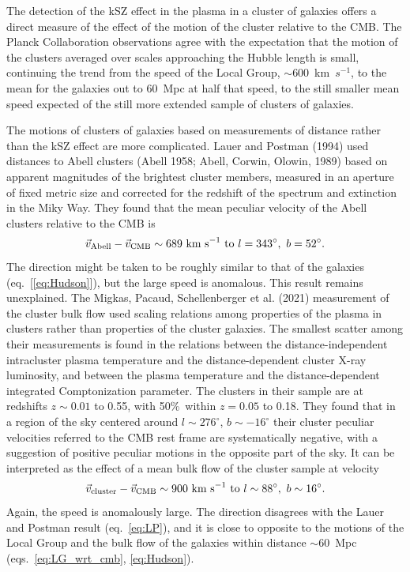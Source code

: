 \documentclass[fleqn,usenatbib]{mnras}
\newcommand{\beq}{\begin{equation}}
\newcommand{\eeq}{\end{equation}}
\begin{document}
The detection of the kSZ effect in the plasma in a cluster of galaxies offers a direct measure of the effect of the motion of the cluster relative to the CMB. The Planck Collaboration observations agree with the expectation that the motion of the clusters averaged over scales approaching the Hubble length is small, continuing the trend from the speed of the Local Group, $\sim 600$~km~$s^{-1}$, to the mean for the galaxies out to 60~Mpc at half that speed, to the still smaller mean speed expected of the still more extended sample of clusters of galaxies. 

The motions of clusters of galaxies based on measurements of distance rather than the kSZ effect are more complicated. Lauer and Postman (1994) used distances to Abell clusters  (Abell 1958; Abell, Corwin, Olowin, 1989) based on apparent magnitudes of the brightest cluster members, measured in an aperture of fixed metric size and corrected for the redshift of the spectrum and extinction in the Miky Way. They found that the mean peculiar velocity of the Abell clusters relative to the CMB is
\beq
{\vec v}_{\rm Abell} - {\vec v}_{\rm CMB} \sim 689\hbox{ km s}^{-1}\hbox{ to } l = 343^\circ ,\ b = 52^\circ.\label{eq:LP}
\eeq
The direction might be taken to be roughly similar to that of the galaxies (eq.~[\ref{eq:Hudson}]), but the large speed is anomalous. This result remains unexplained. The Migkas, Pacaud, Schellenberger et al. (2021) measurement of the cluster bulk flow used scaling relations among properties of the plasma in clusters rather than properties of the cluster galaxies. The smallest scatter among their measurements is found in the relations between the distance-independent intracluster plasma temperature and the distance-dependent cluster X-ray luminosity,  and between the plasma temperature and the distance-dependent integrated Comptonization parameter. The clusters in their sample are at redshifts $z\sim 0.01$ to 0.55, with 50\%\ within $z=0.05$ to 0.18. They found that in a region of the sky centered around $l\sim 276^\circ$, $b \sim -16^\circ$ their cluster peculiar velocities referred to the CMB rest frame are systematically negative, with a suggestion of positive peculiar motions in the opposite part of the sky. It can be interpreted as the effect of a mean bulk flow of the cluster sample at velocity
\beq
{\vec v}_{\rm cluster} - {\vec v}_{\rm CMB} \sim 900\hbox{ km s}^{-1}\hbox{ to } l \sim 88^\circ,\ b \sim 16^\circ.\label{eq:Migkasetal}
\eeq
Again, the speed is anomalously large. The direction disagrees with the Lauer and Postman result (eq.~\ref{eq:LP}), and it is close to opposite to the motions of the Local Group and the bulk flow of the galaxies within distance $\sim 60$~Mpc (eqs.~\ref{eq:LG_wrt_cmb}, \ref{eq:Hudson}).
\end{document}
